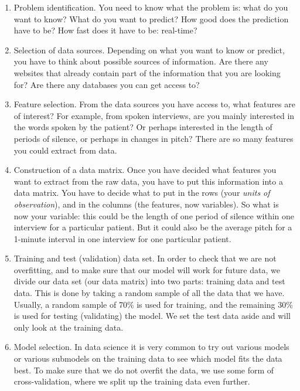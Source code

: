 \documentclass[]{book}\usepackage[]{graphicx}\usepackage[]{color}
\begin{document}
\begin{enumerate}
\item
Problem identification. 
You need to know what the problem is: what do you want to know? What do you want to predict? How good does the prediction have to be? How fast does it have to be: real-time?

\item
Selection of data sources. 
Depending on what you want to know or predict, you have to think about possible sources of information. Are there any websites that already contain part of the information that you are looking for? Are there any databases you can get access to? 

\item 
Feature selection.
From the data sources you have access to, what features are of interest? For example, from spoken interviews, are you mainly interested in the words spoken by the patient? Or perhaps interested in the length of  periods of silence, or perhaps in changes in pitch? There are so many features you could extract from data.

\item
Construction of a data matrix.
Once you have decided what features you want to extract from the raw data, you have to put this information into a data matrix. You have to decide what to put in the rows (your \textit{units of observation}), and in the columns (the features, now variables). So what is now your variable: this could be the length of one period of silence within one interview for a particular patient. But it could also be the average pitch for a 1-minute interval in one interview for one particular patient. 


\item 
Training and test (validation) data set.
In order to check that we are not overfitting, and to make sure that our model will work for future data, we divide our data set (our data matrix) into two parts: training data and test data. This is done by taking a random sample of all the data that we have. Usually, a random sample of 70\% is used for training, and the remaining 30\% is used for testing (validating) the model. We set the test data aside and will only look at the training data. 


\item
Model selection. 
In data science it is very common to try out various models or various submodels on the training data to see which model fits the data best. To make sure that we do not overfit the data, we use some form of cross-validation, where we split up the training data even further. 


\end{enumerate}
\end{document}
